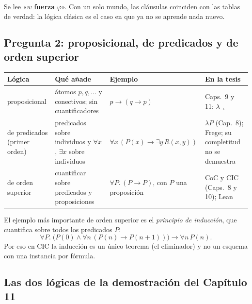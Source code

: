 \documentclass[11pt,a4paper]{article}
\newcommand{\termino}[1]{\textbf{#1}}
\begin{document}
Se lee «\(w\) \termino{fuerza} \(\varphi\)». Con un solo mundo, las cláusulas
coinciden con las tablas de verdad: la lógica clásica es el caso en que ya no
se aprende nada nuevo.

\subsection{Pregunta 2: proposicional, de predicados y de orden superior}

\begin{center}
\renewcommand{\arraystretch}{1.3}
{\small
\begin{tabular}{@{}>{\raggedright\arraybackslash}p{3.0cm} >{\raggedright\arraybackslash}p{4.4cm} >{\raggedright\arraybackslash}p{3.9cm} >{\raggedright\arraybackslash}p{3.5cm}@{}}
\toprule
\textbf{Lógica} & \textbf{Qué añade} & \textbf{Ejemplo} & \textbf{En la tesis}\\
\midrule
proposicional & átomos \(p,q,\dots\) y conectivos; sin cuantificadores & \(p\to(q\to p)\) & Caps.\ 9 y 11; \(\lambda_\to\)\\
de predicados (primer orden) & predicados sobre individuos y \(\forall x\), \(\exists x\) sobre individuos & \(\forall x\,(P(x)\to\exists y\,R(x,y))\) & \(\lambda P\) (Cap.\ 8); Frege; su completitud no se demuestra\\
de orden superior & cuantificar sobre predicados y proposiciones & \(\forall P.\,(P\to P)\), con \(P\) una proposición & CoC y CIC (Caps.\ 8 y 10); Lean\\
\bottomrule
\end{tabular}}
\end{center}

El ejemplo más importante de orden superior es el \emph{principio de
inducción}, que cuantifica sobre todos los predicados \(P\):
\[
\forall P.\;\bigl(P(0)\wedge\forall n\,(P(n)\to P(n+1))\bigr)\to\forall n\,P(n).
\] Por eso en CIC la inducción es un único
teorema (el eliminador) y no un esquema con una instancia por fórmula.

\subsection{Las dos lógicas de la demostración del Capítulo 11}
\end{document}
